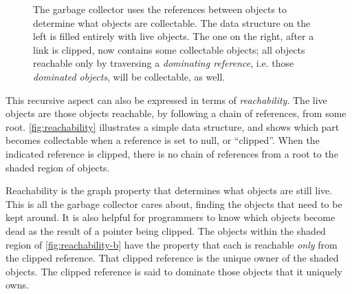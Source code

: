 \begin{figure}
\centering
	\hspace{0.18\textwidth}
	\caption{The garbage collector uses the references between objects to
	determine what objects are collectable. The data structure on the left is
	filled entirely with live objects. The one on the right, after a link is
	clipped, now contains some collectable objects; all objects reachable only by
	traversing a \emph{dominating reference}, i.e. those \emph{dominated objects},
	will be collectable, as well.}
	\label{fig:reachability}
\end{figure}

This recursive aspect can also be expressed in terms of \emph{reachability}.
 The live objects are those objects reachable, by following a
chain of references, from some root. \autoref{fig:reachability} illustrates a
simple data structure, and shows which part becomes collectable when a reference
is set to null, or ``clipped''. When the indicated reference is clipped, there is
no chain of references from a root to the shaded region of objects.

Reachability is the graph property that determines what objects are still live.
This is all the garbage collector cares about, finding the objects that need to
be kept around. It is also helpful for programmers to know which objects become
dead as the result of a pointer being clipped. The objects within the shaded
region of \autoref{fig:reachability-b} have the property that each is reachable
\emph{only} from the clipped reference. That clipped reference is the unique
owner of the shaded objects. The clipped reference is said to dominate those
objects that it uniquely owns.

